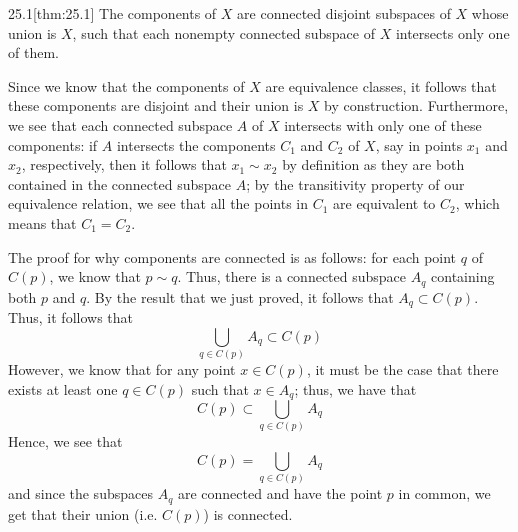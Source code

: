 \begin{thmBox}{25.1}[thm:25.1]
    The components of \( X \) are connected disjoint subspaces of \( X \) whose
    union is \( X \), such that each nonempty connected subspace of \( X \) 
    intersects only one of them.

    \baseRule

    \begin{proofBox}
        Since we know that the components of \( X \) are equivalence classes,
        it follows that these components are disjoint and their union is \( X \)
        by construction.
        Furthermore, we see that each connected subspace \( A \) of \( X \) 
        intersects with only one of these components: if \( A \) 
        intersects the components \( C_{ 1 } \) and \( C_{ 2 } \) of 
        \( X \), say in points \( x_{ 1 } \) and \( x_{ 2 } \), respectively, 
        then it follows that \( x_{ 1 } \sim x_{ 2 } \) by definition as they
        are both contained in the connected subspace \( A \); by the 
        transitivity property of our equivalence relation, we see that 
        all the points in \( C_{ 1 } \) are equivalent to \( C_{ 2 } \), which
        means that \( C_{ 1 } = C_{ 2 } \).

        \baseSkip 

        The proof for why components are connected is as follows: for each 
        point \( q \) of \( C ( p ) \), we know that \( p \sim q \).
        Thus, there is a connected subspace \( A_{ q } \) containing 
        both \( p \) and \( q \). 
        By the result that we just proved, it follows that 
        \( A_{ q } \subset C ( p ) \).
        Thus, it follows that 
        \begin{equation*}
            \bigcup_{ q \in C ( p ) } A_{ q }
            \subset 
            C ( p )
        \end{equation*}
        However, we know that for any point \( x \in C ( p ) \), it must be the 
        case that there exists at least one \( q \in C ( p ) \) such that 
        \( x \in A_{ q } \); thus, we have that
        \begin{equation*}
            C ( p )
            \subset
            \bigcup_{ q \in C ( p ) } A_{ q }
        \end{equation*}
        Hence, we see that 
        \begin{equation*}
            C ( p )
            =
            \bigcup_{ q \in C ( p ) } A_{ q }
        \end{equation*}
        and since the subspaces \( A_{ q } \) are connected and have the point
        \( p \) in common, we get that their union (i.e. \( C ( p ) \)) is 
        connected.
    \end{proofBox}
\end{thmBox}

